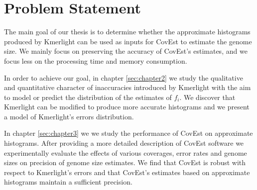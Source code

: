 \section{Problem Statement}
The main goal of our thesis is to determine whether the approximate histograms
produced by Kmerlight can be used as inputs for CovEst to
estimate the genome size. We mainly focus on preserving the 
accuracy of CovEst's estimates, and we focus less on the processing time and memory consumption. 

In order to achieve our goal, in chapter \ref{sec:chapter2} we study the qualitative
and quantitative character of inaccuracies introduced by Kmerlight with the aim to model or
predict the distribution of the estimates of $f_i$. We discover that Kmerlight can be modified
to produce more accurate histograms and we present a model of Kmerlight's errors distribution.

In chapter \ref{sec:chapter3} we we study the performance of CovEst on approximate
histograms. After providing a more detailed description of CovEst software
we experimentally evaluate the effects of various coverages, error rates and genome sizes
on precision of genome size estimates. We find that CovEst is robust with respect to 
Kmerlight's errors and that CovEst's estimates based on approximate histograms maintain
a sufficient precision.
